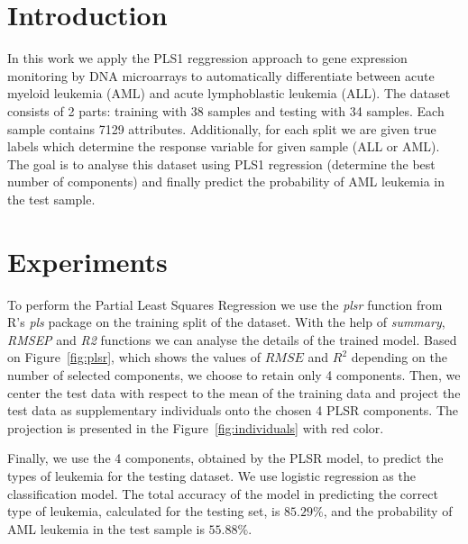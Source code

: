 \documentclass[a4,12pt]{article}
\begin{document}
    \section{Introduction}

    In this work we apply the PLS1 reggression approach to gene expression monitoring by DNA microarrays to automatically differentiate between acute myeloid leukemia (AML) and acute lymphoblastic leukemia (ALL).
    The dataset consists of 2 parts: training with 38 samples and testing with 34 samples.
    Each sample contains 7129 attributes.
    Additionally, for each split we are given true labels which determine the response variable for given sample (ALL or AML).
    The goal is to analyse this dataset using PLS1 regression (determine the best number of components) and finally predict the probability of AML leukemia in the test sample.

    \section{Experiments}

    To perform the Partial Least Squares Regression we use the \textit{plsr} function from R's \textit{pls} package on the training split of the dataset.
    With the help of \textit{summary}, \textit{RMSEP} and \textit{R2} functions we can analyse the details of the trained model.
    Based on Figure~\ref{fig:plsr}, which shows the values of $RMSE$ and $R^2$ depending on the number of selected components, we choose to retain only 4 components.
    Then, we center the test data with respect to the mean of the training data and project the test data as supplementary individuals onto the chosen 4 PLSR components.
    The projection is presented in the Figure~\ref{fig:individuals} with red color.

    \bigskip

    Finally, we use the 4 components, obtained by the PLSR model, to predict the types of leukemia for the testing dataset.
    We use logistic regression as the classification model.
    The total accuracy of the model in predicting the correct type of leukemia, calculated for the testing set, is $85.29\%$, and the probability of AML leukemia in the test sample is $55.88\%$.
\end{document}
